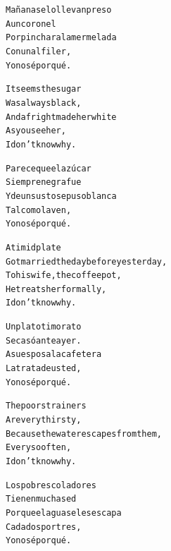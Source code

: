 \documentclass[11pt]{article}
\begin{document}
\begin{parcolumns}{2}
\colchunk
{
\begin{alltt}\normalfont
Mañana se lo llevan preso
A un coronel
Por pinchar a la mermelada
Con un alfiler,
Yo no sé por qué.
\end{alltt}
}

\colplacechunks

\colchunk
{
\begin{alltt}\normalfont
It seems the sugar
Was always black,
And a fright made her white
As you see her,
I don’t know why.
\end{alltt}
}

\colchunk
{
\begin{alltt}\normalfont
Parece que el azúcar
Siempre negra fue
Y de un susto se puso blanca
Tal como la ven,
Yo no sé por qué.
\end{alltt}
}

\colplacechunks

\colchunk
{
\begin{alltt}\normalfont
A timid plate
Got married the day before yesterday,
To his wife, the coffee pot,
He treats her formally,
I don’t know why.
\end{alltt}
}

\colchunk
{
\begin{alltt}\normalfont
Un plato timorato
Se casó anteayer.
A su esposa la cafetera
La trata de usted,
Yo no sé por qué.
\end{alltt}
}

\colplacechunks

\colchunk
{
\begin{alltt}\normalfont
The poor strainers
Are very thirsty,
Because the water escapes from them,
Every so often,
I don’t know why.
\end{alltt}
}

\colchunk
{
\begin{alltt}\normalfont
Los pobres coladores
Tienen mucha sed
Porque el agua se les escapa
Cada dos por tres,
Yo no sé por qué.
\end{alltt}
}

\colplacechunks

\end{parcolumns}
\end{document}
